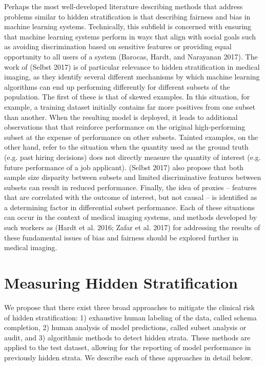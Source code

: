 \documentclass{article}
\begin{document}
Perhaps the most well-developed literature describing methods that address problems similar to hidden stratification is that describing fairness and bias in machine learning systems. 
 Technically, this subfield is concerned with ensuring that machine learning systems perform in ways that align with social goals such as avoiding discrimination based on sensitive features or providing equal opportunity to all users of a system (Barocas, Hardt, and Narayanan 2017).  
 The work of (Selbst 2017) is of particular relevance to hidden stratification in medical imaging, as they identify several different mechanisms by which machine learning algorithms can end up performing differently for different subsets of the population. 
  The first of these is that of skewed examples.  
  In this situation, for example, a training dataset initially contains far more positives from one subset than another.  
  When the resulting model is deployed, it leads to additional observations that that reinforce performance on the original high-performing subset at the expense of performance on other subsets. 
  Tainted examples, on the other hand, refer to the situation when the quantity used as the ground truth (e.g. past hiring decisions) does not directly measure the quantity of interest (e.g. future performance of a job applicant).  
  (Selbst 2017) also propose that both sample size disparity between subsets and limited discriminative features between subsets can result in reduced performance. 
   Finally, the idea of proxies -- features that are correlated with the outcome of interest, but not causal -- is identified as a determining factor in differential subset performance. 
    Each of these situations can occur in the context of medical imaging systems, and methods developed by such workers as  (Hardt et al. 2016; Zafar et al. 2017) for addressing the results of these fundamental issues of bias and fairness should be explored further in medical imaging.  

\section{Measuring Hidden Stratification}

We propose that there exist three broad approaches to mitigate the clinical risk of hidden stratification: 1) exhaustive human labeling of the data, called schema completion, 2) human analysis of model predictions, called subset analysis or audit, and 3) algorithmic methods to detect hidden strata. These methods are applied to the test dataset, allowing for the reporting of model performance in previously hidden strata.  We describe each of these approaches in detail below.  
\end{document}
